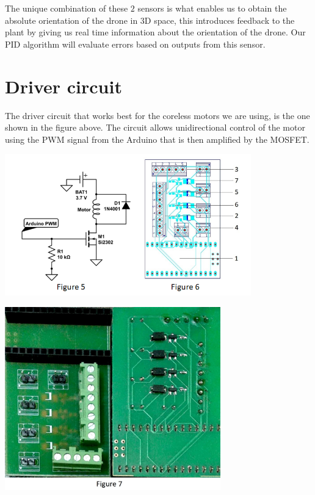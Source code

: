 \documentclass[9pt]{article}
\begin{document}
\noindent The unique combination of these $2$ sensors is what enables us to obtain the absolute orientation of the drone in $3$D space, this introduces feedback to the plant by giving us real time information about the orientation of the drone. Our PID algorithm will evaluate errors based on outputs from this sensor.\\

\section{Driver circuit}
The driver circuit that works best for the coreless motors we are using, is the one shown in the figure above. The circuit allows unidirectional control of the motor using the PWM signal from the Arduino that is then amplified by the MOSFET.\\

\begin{center}
\includegraphics[width=0.8\textwidth]{6.jpg}
\end{center}

\begin{center}
\includegraphics[width=0.7\textwidth]{7.jpg}
\end{center}
\end{document}
